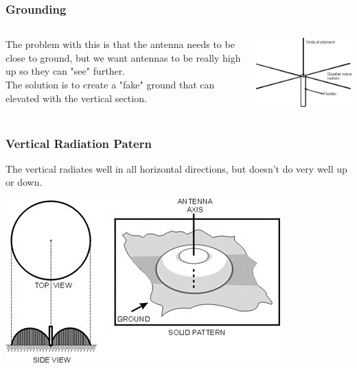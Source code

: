 \documentclass[10pt]{beamer}
\begin{document}
\begin{frame}
\frametitle{Grounding}
\begin{columns}
\begin{column}{.5\textwidth}
The problem with this is that the antenna needs to be close to ground, but we want antennas to be really high up so they can "see" further.\\
The solution is to create a "fake" ground that can elevated with the vertical section.
\end{column}
\begin{column}{.5\textwidth}
\includegraphics[width=\textwidth]{qwavevertwground.png}
\end{column}
\end{columns}
\end{frame}

\begin{frame}
\frametitle{Vertical Radiation Patern}
The vertical radiates well in all horizontal directions, but doesn't do very well up or down.
\begin{center}
\includegraphics[height=.7\textheight]{qwavevertrad.png}
\end{center}
\end{frame}
\end{document}
